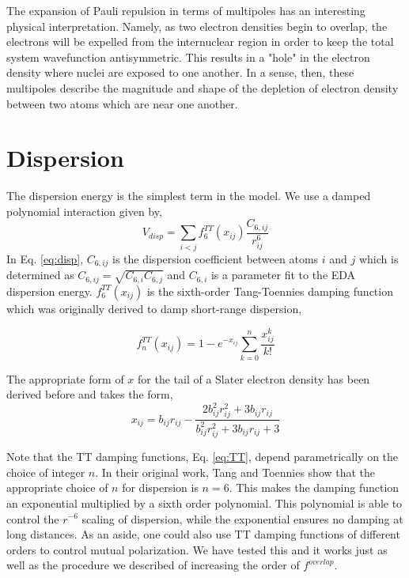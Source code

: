 \documentclass[journal=jacsat,manuscript=article]{achemso}
\begin{document}
The expansion of Pauli repulsion in terms of multipoles has an interesting physical interpretation.
Namely, as two electron densities begin to overlap, the electrons will be expelled
from the internuclear region in order to keep the total system wavefunction antisymmetric.
This results in a "hole" in the electron density where nuclei are exposed to one another.
In a sense, then, these multipoles describe the magnitude and shape of the depletion of electron density
between two atoms which are near one another.

\section*{Dispersion}

The dispersion energy is the simplest term in the model. We use a damped
polynomial interaction given by,
\begin{equation}
  V_{disp}=\sum_{i<j}f_6^{TT}(x_{ij})\frac{C_{6,ij}}{r_{ij}^6}
  \label{eq:disp}
\end{equation}
\noindent
In Eq. \ref{eq:disp}, $C_{6,ij}$ is the dispersion coefficient between atoms
$i$ and $j$ which is determined as $C_{6,ij}=\sqrt{C_{6,i}C_{6,j}}$ and $C_{6,i}$ is
a parameter fit to the EDA dispersion energy. $f_6^{TT}(x_{ij})$ is the sixth-order
Tang-Toennies damping function\cite{tang1984improved} which was originally derived
to damp short-range dispersion,

\begin{equation}
  f_n^{TT}(x_{ij}) = 1-e^{-x_{ij}}\sum_{k=0}^n\frac{x_{ij}^k}{k!}
  \label{eq:TT}
\end{equation}

The appropriate form of $x$ for the tail of a Slater electron density
has been derived before\cite{van2016beyond} and takes the form,
\begin{equation}
  x_{ij}=b_{ij}r_{ij}-\frac{2b_{ij}^2r_{ij}^2+3b_{ij}r_{ij}}{b_{ij}^2r_{ij}^2+3b_{ij}r_{ij}+3}
  \label{eq:TT_x}
\end{equation}

Note that the TT damping functions, Eq. \ref{eq:TT}, depend parametrically on
the choice of integer $n$. In their original work, Tang and Toennies show that the appropriate choice
of $n$ for dispersion is $n=6$. This makes the damping function an exponential multiplied by a sixth order polynomial.
This polynomial is able to control the $r^{-6}$ scaling of dispersion, while the exponential ensures no
damping at long distances. As an aside, one could also use TT damping functions of different orders to control
mutual polarization. We have tested this and it works just as well as the procedure we
described of increasing the order of $f^{overlap}$.
\end{document}
